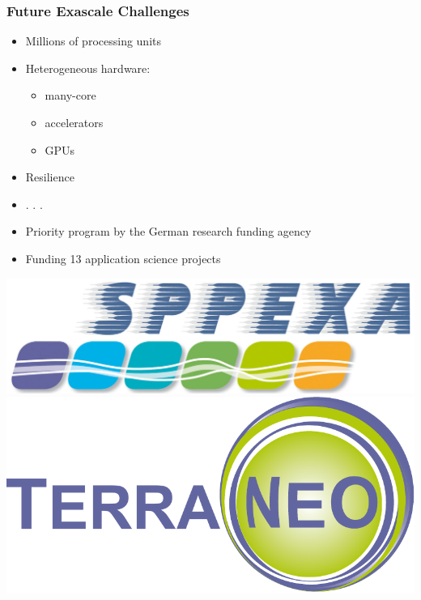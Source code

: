 \documentclass[t,compress=false,usepdftitle=false]{beamer}
\begin{document}
\begin{frame}\frametitle{Future Exascale Challenges}
\vspace*{-3mm}
\centering
\begin{myColorBox}{.7}{}\color{linkcolor}
\begin{itemize}
 \item Millions of processing units
 \item Heterogeneous hardware:
\begin{itemize}
 \item many-core
 \item accelerators
 \item GPUs
\end{itemize}
 \item Resilience
 \item . . .
\end{itemize}
\end{myColorBox}
\begin{itemize}
 \item Priority program by the German research funding agency
 \item Funding 13 application science projects
\end{itemize}
\hspace{13mm}
\includegraphics[height=0.13\textheight]{sppexa.png}
\hspace{13mm}
\includegraphics[height=0.17\textheight]{tn-logo-crop.pdf}
\end{frame}
\end{document}
